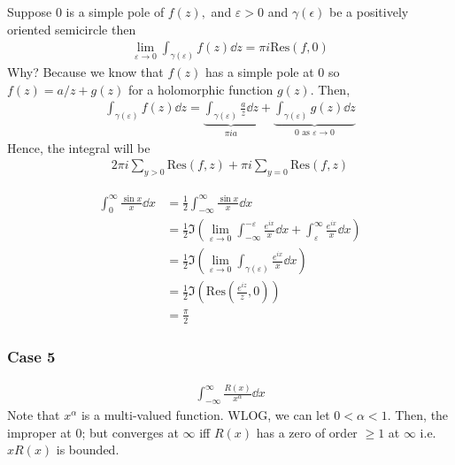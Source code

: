 \documentclass[a4paper,12pt]{article}
\begin{document}
Suppose $0$ is a simple pole of $f(z),$ and $\varepsilon>0$ and $\gamma(\epsilon)$ be a positively oriented semicircle then \begin{align}
    \lim_{\varepsilon\to 0}\int_{\gamma(\varepsilon)}f(z)\dd z=\pi i\mathrm{Res}(f,0)
\end{align}
Why? Because we know that $f(z)$ has a simple pole at $0$ so $f(z)=a/z+g(z)$ for a holomorphic function $g(z).$ Then, \begin{align}
    \int_{\gamma(\varepsilon)}f(z)\dd z=\underbrace{\int_{\gamma(\varepsilon)}\frac{a}{z}\dd z}_{\pi ia}+\underbrace{\int_{\gamma(\varepsilon)}g(z)\dd z}_{0\text{ as $\varepsilon\to 0$}}
\end{align}
Hence, the integral will be \begin{align}
    2\pi i\sum_{y>0}\mathrm{Res}(f,z)+\pi i\sum_{y=0}\mathrm{Res}(f,z)
\end{align}
\begin{example}
    \begin{align}
        \int_{0}^\infty\frac{\sin x}{x}\dd x&=\frac{1}{2}\int_{-\infty}^\infty\frac{\sin x}{x}\dd x\\
        &=\frac{1}{2}\Im\left(\lim_{\varepsilon\to0}\int_{-\infty}^{-\varepsilon}\frac{e^{ix}}{x}\dd x+\int_{\varepsilon}^\infty \frac{e^{ix}}{x}\dd x\right)\\
        &=\frac{1}{2}\Im\left(\lim_{\varepsilon\to0}\int_{\gamma(\varepsilon)}\frac{e^{ix}}{x}\dd x\right)\\
        &=\frac{1}{2}\Im\left(\mathrm{Res}\left(\frac{e^{iz}}{z},0\right)\right)\\
        &=\frac{\pi}{2}
    \end{align}
\end{example}
\subsubsection{Case 5}
\begin{align}
    \int_{-\infty}^\infty\frac{R(x)}{x^\alpha}\dd x
\end{align}
Note that $x^\alpha$ is a multi-valued function. WLOG, we can let $0<\alpha<1.$ Then, the improper at $0$; but converges at $\infty$ iff $R(x)$ has a zero of order $\geq 1$ at $\infty$ i.e. $xR(x)$ is bounded.
\end{document}
